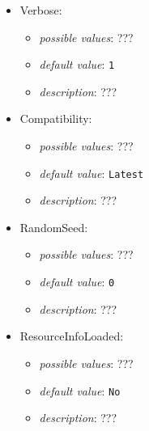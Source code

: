 \documentclass{article}
\begin{document}
\begin{itemize}
    \item Verbose:
           \begin{itemize}
                \item \emph{possible values}: ???
                \item \emph{default value}: \texttt{1}
                \item \emph{description}: ???
           \end{itemize}
    \item Compatibility:
           \begin{itemize}
                \item \emph{possible values}: ???
                \item \emph{default value}: \texttt{Latest}
                \item \emph{description}: ???
           \end{itemize}
    \item RandomSeed:
           \begin{itemize}
                \item \emph{possible values}: ???
                \item \emph{default value}: \texttt{0}
                \item \emph{description}: ???
           \end{itemize}
    \item ResourceInfoLoaded:
           \begin{itemize}
                \item \emph{possible values}: ???
                \item \emph{default value}: \texttt{No}
                \item \emph{description}: ???
           \end{itemize}
\end{itemize}
\end{document}
